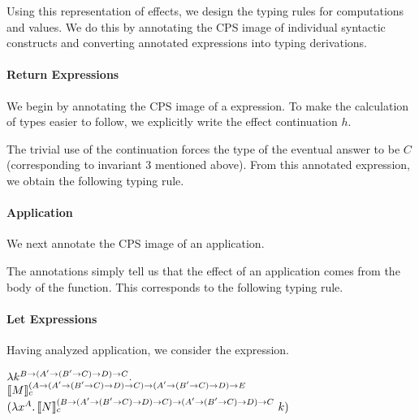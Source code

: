 Using this representation of effects, we design the typing rules for
\lambdah computations and values.
We do this by annotating the CPS image of individual syntactic constructs
and converting annotated expressions into typing derivations.

\paragraph{Return Expressions}

We begin by annotating the CPS image of a \returntt expression.
To make the calculation of types easier to follow, we explicitly write the
effect continuation $h$.


\noindent The trivial use of the continuation forces the type of the eventual
answer to be $C$ (corresponding to invariant 3 mentioned above).
From this annotated expression, we obtain the following typing rule.


\paragraph{Application}

We next annotate the CPS image of an application.


\noindent The annotations simply tell us that the effect of an application
comes from the body of the function.
This corresponds to the following typing rule.


\paragraph{Let Expressions}

Having analyzed application, we consider the  expression.

\bigskip

$\lambda k^{B \rightarrow (A^\prime \rightarrow (B^\prime \rightarrow C) \rightarrow D) \rightarrow C}.$ \\
\vspace{1mm} \qquad
$\llbracket M \rrbracket_c^{(A \rightarrow (A^\prime \rightarrow (B^\prime \rightarrow C) \rightarrow D) \rightarrow C) \rightarrow (A^\prime \rightarrow (B^\prime \rightarrow C) \rightarrow D) \rightarrow E}$ \\
\vspace{1mm} \qquad
$(\lambda x^A.\, \llbracket N \rrbracket_c^{(B \rightarrow (A^\prime \rightarrow (B^\prime \rightarrow C) \rightarrow D) \rightarrow C) \rightarrow (A^\prime \rightarrow (B^\prime \rightarrow C) \rightarrow D) \rightarrow C} \ k)$

